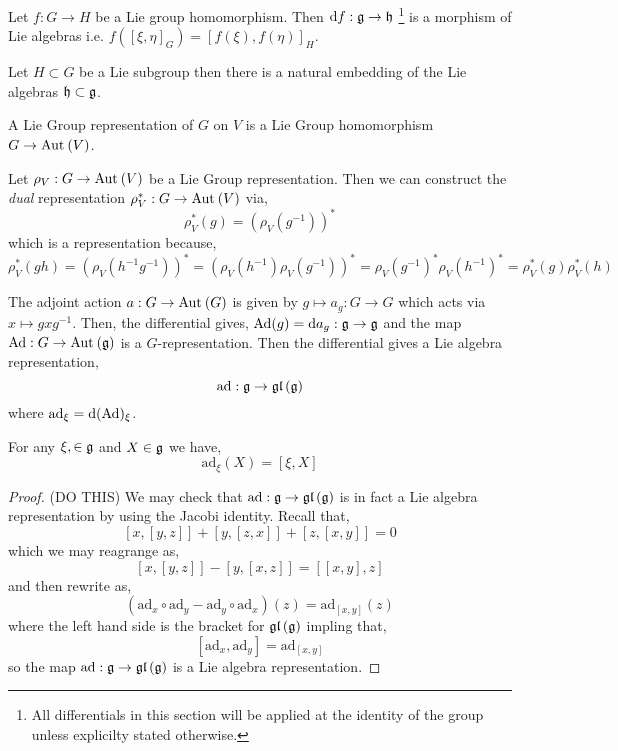 \documentclass[12pt]{article}
\begin{document}
\newcommand{\h}{\mathfrak{h}}

\begin{proposition}
Let $f : G \to H$ be a Lie group homomorphism. Then $\d{f} : \g \to \h$ \footnote{All differentials in this section will be applied at the identity of the group unless explicilty stated otherwise.} is a morphism of Lie algebras i.e. $f([\xi, \eta]_G) = [f(\xi), f(\eta)]_H$. 
\end{proposition}

\begin{corollary}
Let $H \subset G$ be a Lie subgroup then there is a natural embedding of the Lie algebras $\h \subset \g$. 
\end{corollary}

\begin{definition}
A Lie Group representation of $G$ on $V$ is a Lie Group homomorphism $G \to \mathrm{Aut}_{} \left( V \right)$. 
\end{definition}

\begin{definition}
Let $\rho_V : G \to \mathrm{Aut}_{} \left( V \right)$ be a Lie Group representation. Then we can construct the \textit{dual} representation $\rho_V^* : G \to \mathrm{Aut}_{} \left( V \right)$ via,
\[ \rho_V^*(g) = (\rho_V(g^{-1}))^* \]
which is a representation because,
\[ \rho_V^*(gh) = \left( \rho_V(h^{-1} g^{-1}) \right)^* = \left( \rho_V(h^{-1}) \rho_V(g^{-1}) \right)^* = \rho_V(g^{-1})^* \rho_V(h^{-1})^* = \rho_V^*(g) \rho_V^*(h) \]
\end{definition}

\newcommand{\Ad}{\mathrm{Ad}}
\newcommand{\ad}{\mathrm{ad}}
\newcommand{\gl}[1]{\mathfrak{gl}\left( #1 \right)}

\begin{definition}
The adjoint action $a : G \to \mathrm{Aut}_{} \left( G \right)$ is given by $g \mapsto a_g : G \to G$ which acts via $x \mapsto g x g^{-1}$. Then, the differential gives, $\Ad(g) = \d{a_g} : \g \to \g$ and the map $\Ad : G \to \Aut{\g}$ is a $G$-representation. Then the differential gives a Lie algebra representation,
\[ \ad : \g \to \gl{\g} \]
where $\ad_\xi = \d{(\Ad)_\xi}$. 
\end{definition}

\begin{theorem}
For any $\xi, \in \mathfrak{g}$ and $X \in \mathfrak{g}$ we have,
\[ \ad_\xi(X) = [\xi, X ] \]
\end{theorem}

\begin{proof}
(DO THIS)
We may check that $\ad : \g \to \gl{\g}$ is in fact a Lie algebra representation by using the Jacobi identity. Recall that,
\[ [x, [y, z]] + [y, [z, x]] + [z, [x, y]] = 0 \]
which we may reagrange as,
\[ [x, [y, z]] - [y, [x, z]] = [[x, y], z] \]
and then rewrite as,
\[ (\ad_x \circ \ad_y - \ad_y \circ \ad_x)(z) = \ad_{[x, y]}(z) \]
where the left hand side is the bracket for $\gl{\g}$ impling that,
\[ [ \ad_x, \ad_y ] = \ad_{[x, y]} \]
so the map $\ad : \g \to \gl{\g}$ is a Lie algebra representation.
\end{proof}
\end{document}
